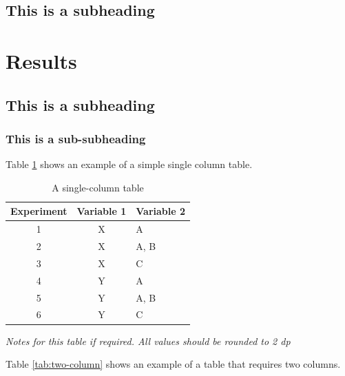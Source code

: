 \documentclass[paper=a4,fontsize=11pt,twocolumn]{article}
\begin{document}
\subsection{This is a subheading}
\lipsum[10-11]
\cite {Burns1981}

\section{Results}
\subsection{This is a subheading}
\subsubsection{This is a sub-subheading}

Table \ref{tab:one-column} shows an example of a simple single column table.

\begin{table}
\begin{centering}
\caption{A single-column table}\label{tab:one-column}
	\begin{tabular}[\columnwidth]{ccl}\toprule
		Experiment &  Variable 1 &  Variable 2 \\
		\midrule
		1  & X & A \\
		2  & X & A, B \\
		3  & X & C \\
		4  & Y & A \\
		5  & Y & A, B \\
		6  & Y & C \\
		\bottomrule
	\end{tabular}\par
	\medskip
\textit{Notes for this table if required. All values should be rounded to 2 dp}
\end{centering}
\end{table}

Table \ref{tab:two-column} shows an example of a table that requires two columns.
\end{document}
